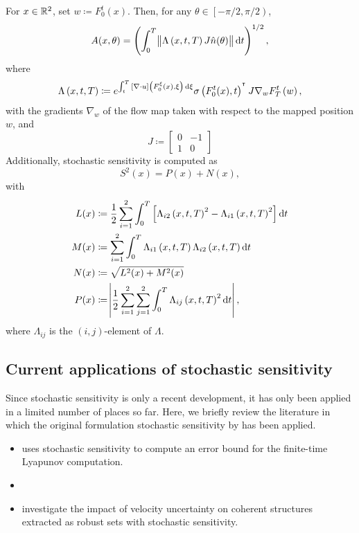 \begin{theorem}
	For \(x \in \mathbb{R}^2\), set \(w \coloneqq F_0^t(x)\).
	Then, for any \(\theta \in \left[-\pi/2, \pi/2\right)\),
	\[
		A(x,\theta) = \left(\int_0^T{\norm{\Lambda\left(x, t, T\right)J\hat{n}(\theta)}\dif t}\right)^{1/2},
	\]
	where
	\[
		\Lambda\left(x,t,T\right) \coloneqq e^{\int_t^T{\left[\nabla \cdot u\right]\left(F_0^\xi(x), \xi\right)\dif\xi}}\sigma\left(F_0^t(x), t\right)^{\T}J \nabla_w F_T^t\left(w\right),
	\]
	with the gradients \(\nabla_w\) of the flow map taken with respect to the mapped position \(w\), and 
	\[
		J \coloneqq \begin{bmatrix}
			0 & -1 \\ 
			1 & 0
		\end{bmatrix}
	\]
	Additionally, stochastic sensitivity is computed as 
	\[
		S^2(x) = P(x) + N(x),
	\]
	with 
	\begin{align*}
		L(x) & \coloneqq \frac12\sum_{i=1}^2\int_0^T\left[\Lambda_{i2}\left(x,t, T\right)^2 - \Lambda_{i1}\left(x,t,T\right)^2\right]\dif t \\ 
		M(x) & \coloneqq \sum_{i=1}^2\int_0^T{\Lambda_{i1}\left(x,t,T\right)\Lambda_{i2}\left(x,t,T\right)\dif t}\\ 
		N(x) & \coloneqq \sqrt{L^2(x) + M^2(x)} \\ 
		P(x) & \coloneqq \abs{\frac12\sum_{i=1}^2\sum_{j=1}^2{\int_0^T{\Lambda_{ij}\left(x,t,T\right)^2\dif t}}},
	\end{align*}
	where \(\Lambda_{ij}\) is the \((i,j)\)-element of \(\Lambda\).
\end{theorem}


\subsection{Current applications of stochastic sensitivity}
Since stochastic sensitivity is only a recent development, it has only been applied in a limited number of places so far. 
Here, we briefly review the literature in which the original formulation stochastic sensitivity by \cite{Balasuriya_2020_StochasticSensitivityComputable} has been applied.

\begin{itemize}
	\item \cite{Balasuriya_2020_UncertaintyFinitetimeLyapunov} uses stochastic sensitivity to compute an error bound for the finite-time Lyapunov computation.


	\item \cite{FangEtAl_2020_DisentanglingResolutionPrecision} 


	\item \cite{BadzaEtAl_2023_HowSensitiveAre} investigate the impact of velocity uncertainty on coherent structures extracted as robust sets with stochastic sensitivity.

\end{itemize}

